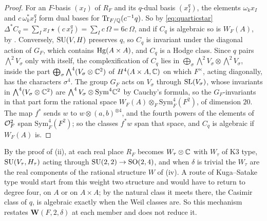 \begin{proof}
For an $F$-basis $(x_{I})$ of $R_{F}$ and its $q$-dual basis $(x_{I}^{q})$, the
elements $\omega_{k}x_{I}$ and $c\,\omega_{k}^{*}x_{I}^{q}$ form dual bases for
$\operatorname{Tr}_{F/\mathbb{Q}}(c^{-1}q)$. So by \eqref{eq:quarticstar}
$\Delta^{*}C_{q}=\sum_{I}x_{I}\star(c\,x_{I}^{q})=\sum_{I}c\,\Omega=6c\,\Omega$,
and if $C_{q}$ is algebraic so is $W_{F}(A)$, by \cite[Proposition~17.3(ii)]{paperI}.
Conversely, $\operatorname{SU}(V,H)$ preserves $q$, so $C_{q}$ is invariant under the
diagonal action of $G_{F}$, which contains $\operatorname{Hg}(A\times A)$, and $C_{q}$ is a
Hodge class. Since $q$ pairs $\bigwedge^{2}V_{\sigma}$ only with itself, the
complexification of $C_{q}$ lies in $\bigoplus_{\sigma}\bigwedge^{2}V_{\sigma}
\otimes\bigwedge^{2}V_{\sigma}$, inside the part
$\bigoplus_{\sigma}\bigwedge^{4}(V_{\sigma}\otimes\mathbb{C}^{2})$ of
$H^{4}(A\times A,\mathbb{C})$ on which $F^{\times}$, acting diagonally, has the
characters $\sigma^{4}$. The group $G_{F}$ acts on $V_{\sigma}$ through
$\operatorname{SL}(V_{\sigma})$, whose invariants in $\bigwedge^{4}(V_{\sigma}\otimes\mathbb{C}^{2})$
are $\bigwedge^{4}V_{\sigma}\otimes\mathrm{Sym}^{4}\mathbb{C}^{2}$ by Cauchy's
formula, so the $G_{F}$-invariants in that part form the rational space
$W_{F}(A)\otimes_{F}\mathrm{Sym}^{4}_{F}(F^{2})$, of dimension $20$. The map
$f^{*}$ sends $w$ to $w\otimes(a,b)^{\otimes4}$, and the fourth powers of the
elements of $\mathcal{O}_{F}^{2}$ span $\mathrm{Sym}^{4}_{F}(F^{2})$; so the classes
$f^{*}w$ span that space, and $C_{q}$ is algebraic if $W_{F}(A)$ is.
\end{proof}

\begin{remark}\label{rem:quarticisogeny}
By the proof of (ii), at each real place $R_{F}$ becomes
$W_{\tau}\otimes\mathbb{C}$ with $W_{\tau}$ of K3 type, $\operatorname{SU}(V_{\tau},H_{\tau})$ acting
through $\operatorname{SU}(2,2)\to\mathrm{SO}(2,4)$, and when $\delta$ is trivial the
$W_{\tau}$ are the real components of the rational structure $W$ of
(iv). A route of Kuga--Satake type would start from
this weight two structure and would have to return to degree four, on $A$ or
on $A\times A$; by  the natural class it meets
there, the Casimir class of $q$, is algebraic exactly when the Weil classes
are. So this mechanism restates $\mathbf{W}(F,2,\delta)$ at each member and
does not reduce it.
\end{remark}

